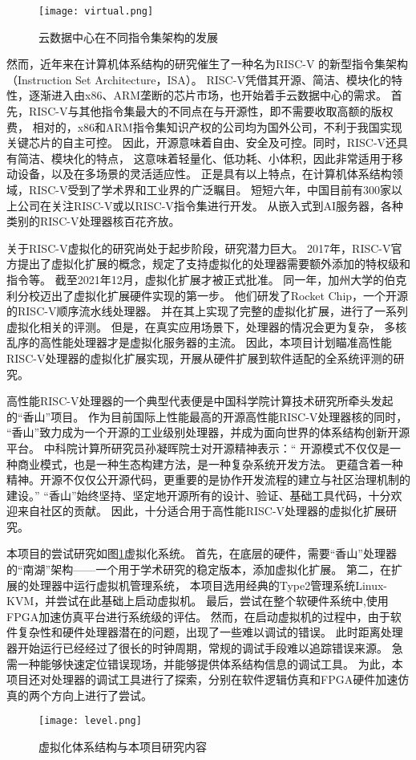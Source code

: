 \begin{figure}[htbp]
\centering
\texttt{[image: virtual.png]}
\caption{云数据中心在不同指令集架构的发展}
\end{figure}

然而，近年来在计算机体系结构的研究催生了一种名为RISC-V\cite{asanovic2014instruction}
的新型指令集架构（Instruction Set Architecture，ISA）。
RISC-V凭借其开源、简洁、模块化的特性，逐渐进入由x86、ARM垄断的芯片市场，也开始着手云数据中心的需求。
首先，RISC-V与其他指令集最大的不同点在与开源性，即不需要收取高额的版权费，
相对的，x86和ARM指令集知识产权的公司均为国外公司，不利于我国实现关键芯片的自主可控。
因此，开源意味着自由、安全及可控。同时，RISC-V还具有简洁、模块化的特点，
这意味着轻量化、低功耗、小体积，因此非常适用于移动设备，以及在多场景的灵活适应性。
正是具有以上特点，在计算机体系结构领域，RISC-V受到了学术界和工业界的广泛瞩目。
短短六年，中国目前有300家以上公司在关注RISC-V或以RISC-V指令集进行开发。
从嵌入式到AI服务器，各种类别的RISC-V处理器核百花齐放。

关于RISC-V虚拟化的研究尚处于起步阶段，研究潜力巨大。
2017年，RISC-V官方提出了虚拟化扩展的概念，规定了支持虚拟化的处理器需要额外添加的特权级和指令等。
截至2021年12月，虚拟化扩展才被正式批准。
同一年，加州大学的伯克利分校迈出了虚拟化扩展硬件实现的第一步。
他们研发了Rocket Chip\cite{itco2022rocket}，一个开源的RISC-V顺序流水线处理器。
并在其上实现了完整的虚拟化扩展，进行了一系列虚拟化相关的评测。
但是，在真实应用场景下，处理器的情况会更为复杂，
多核乱序的高性能处理器才是虚拟化服务器的主流。
因此，本项目计划瞄准高性能RISC-V处理器的虚拟化扩展实现，开展从硬件扩展到软件适配的全系统评测的研究。

高性能RISC-V处理器的一个典型代表便是中国科学院计算技术研究所牵头发起的“香山”项目。
作为目前国际上性能最高的开源高性能RISC-V处理器核的同时，
“香山”致力成为一个开源的工业级别处理器，并成为面向世界的体系结构创新开源平台。
中科院计算所研究员孙凝晖院士对开源精神表示：“
开源模式不仅仅是一种商业模式，也是一种生态构建方法，是一种复杂系统开发方法。
更蕴含着一种精神。开源不仅仅公开源代码，更重要的是协作开发流程的建立与社区治理机制的建设。”
“香山”始终坚持、坚定地开源所有的设计、验证、基础工具代码，十分欢迎来自社区的贡献。
因此，十分适合用于高性能RISC-V处理器的虚拟化扩展研究。

本项目的尝试研究如图\ref{fig:level}虚拟化系统。
首先，在底层的硬件，需要“香山”处理器的“南湖”架构——一个用于学术研究的稳定版本，添加虚拟化扩展。
第二，在扩展的处理器中运行虚拟机管理系统，
本项目选用经典的Type2管理系统Linux-KVM\cite{kvm:H-ext}，并尝试在此基础上启动虚拟机。
最后，尝试在整个软硬件系统中,使用FPGA加速仿真平台进行系统级的评估。
然而，在启动虚拟机的过程中，由于软件复杂性和硬件处理器潜在的问题，出现了一些难以调试的错误。
此时距离处理器开始运行已经经过了很长的时钟周期，常规的调试手段难以追踪错误来源。
急需一种能够快速定位错误现场，并能够提供体系结构信息的调试工具。
为此，本项目还对处理器的调试工具进行了探索，分别在软件逻辑仿真和FPGA硬件加速仿真的两个方向上进行了尝试。

\begin{figure}[htbp]
    \centering
    \texttt{[image: level.png]}
\caption{虚拟化体系结构与本项目研究内容}
    \label{fig:level}
\end{figure}
